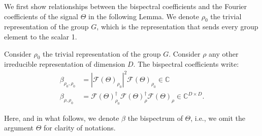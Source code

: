 


We first show relationships between the bispectral coefficients and the Fourier coefficients of the signal $\Theta$ in the following Lemma. We denote $\rho_0$ the trivial representation of the group $G$, which is the representation that sends every group element to the scalar 1.

\begin{lemma}\label{lem:coefs}
    Consider $\rho_0$ the trivial representation of the group $G$. Consider $\rho$ any other irreducible representation of dimension $D$. The bispectral coefficients write:
    \begin{align*}
    \beta_{\rho_0, \rho_0}
    &= |\mathcal{F}(\Theta)_{\rho_0}|^2 \mathcal{F}(\Theta)_{\rho_0}
    \in \mathbb{C}\\
    \beta_{\rho, \rho_0}
    &= \mathcal{F}(\Theta)_{\rho_0}^\dagger
    \mathcal{F}(\Theta)_{\rho}^\dagger\mathcal{F}(\Theta)_{\rho}
    \in \mathbb{C}^{D \times D}.
    \end{align*}
\end{lemma}

Here, and in what follows, we denote $\beta$ the bispectrum of $\Theta$, i.e., we omit the argument $\Theta$ for clarity of notations.

